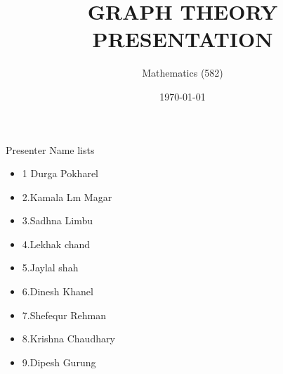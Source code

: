 \documentclass[12pt]{beamer}
\title{GRAPH THEORY PRESENTATION }
\subtitle{Mathematics (582)}
\institute{Central Department of mathematics.}
\date{\today}
\begin{document}
\begin{frame}
\maketitle
\end{frame}

\begin{frame}[t]{Presenter Name lists}
\begin{itemize}
  \item 1 Durga Pokharel
  \item 2.Kamala Lm Magar
  \item 3.Sadhna Limbu
  \item 4.Lekhak chand
  \item 5.Jaylal shah
  \item 6.Dinesh Khanel
  \item 7.Shefequr Rehman 
  \item 8.Krishna Chaudhary
  \item 9.Dipesh Gurung
\end{itemize}
\end{frame}
\end{document}
